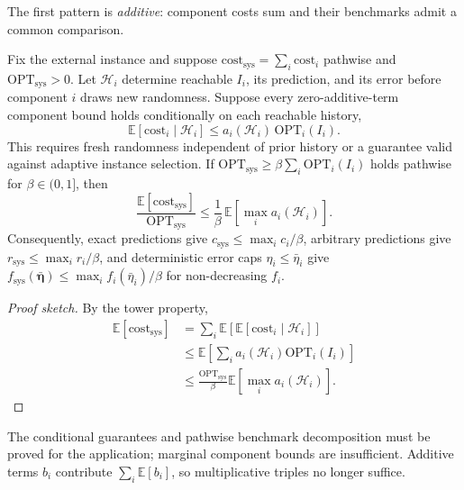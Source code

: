 \documentclass[acmsmall,screen,nonacm]{acmart}
\theoremstyle{acmdefinition}%
\begin{document}
The first pattern is \emph{additive}: component costs sum and their benchmarks admit a common comparison.

\begin{proposition}
\label{prop:additive}
Fix the external instance and suppose $\mathrm{cost}_{\mathrm{sys}}=\sum_i\mathrm{cost}_i$ pathwise and $\mathrm{OPT}_{\mathrm{sys}}>0$. Let $\mathcal H_i$ determine reachable $I_i$, its prediction, and its error before component $i$ draws new randomness. Suppose every zero-additive-term component bound holds conditionally on each reachable history,
\[
  \mathbb E[\mathrm{cost}_i\mid\mathcal H_i]
  \leq a_i(\mathcal H_i)\,\mathrm{OPT}_i(I_i).
\]
This requires fresh randomness independent of prior history or a guarantee valid against adaptive instance selection. If $\mathrm{OPT}_{\mathrm{sys}}\geq\beta\sum_i\mathrm{OPT}_i(I_i)$ holds pathwise for $\beta\in(0,1]$, then
\begin{equation}
  \frac{\mathbb E[\mathrm{cost}_{\mathrm{sys}}]}{\mathrm{OPT}_{\mathrm{sys}}}
  \leq \frac{1}{\beta}\,
  \mathbb E\!\left[\max_i a_i(\mathcal H_i)\right].
    \label{eq_additive}
\end{equation}
Consequently, exact predictions give $c_{\mathrm{sys}}\leq\max_i c_i/\beta$, arbitrary predictions give $r_{\mathrm{sys}}\leq\max_i r_i/\beta$, and deterministic error caps $\eta_i\leq\bar\eta_i$ give $f_{\mathrm{sys}}(\bar{\boldsymbol\eta})\leq\max_i f_i(\bar\eta_i)/\beta$ for non-decreasing $f_i$.
\end{proposition}

\begin{proof}[Proof sketch]
By the tower property,
\[
\begin{aligned}
\mathbb E[\mathrm{cost}_{\mathrm{sys}}]
  &=\sum_i\mathbb E\!\left[\mathbb E[\mathrm{cost}_i\mid\mathcal H_i]\right] \\
  &\leq\mathbb E\!\left[\sum_i a_i(\mathcal H_i)\mathrm{OPT}_i(I_i)\right] \\
  &\leq\frac{\mathrm{OPT}_{\mathrm{sys}}}{\beta}
       \mathbb E\!\left[\max_i a_i(\mathcal H_i)\right].
\end{aligned}
\]
\end{proof}

The conditional guarantees and pathwise benchmark decomposition must be proved for the application; marginal component bounds are insufficient. Additive terms $b_i$ contribute $\sum_i\mathbb E[b_i]$, so multiplicative triples no longer suffice.
\end{document}
